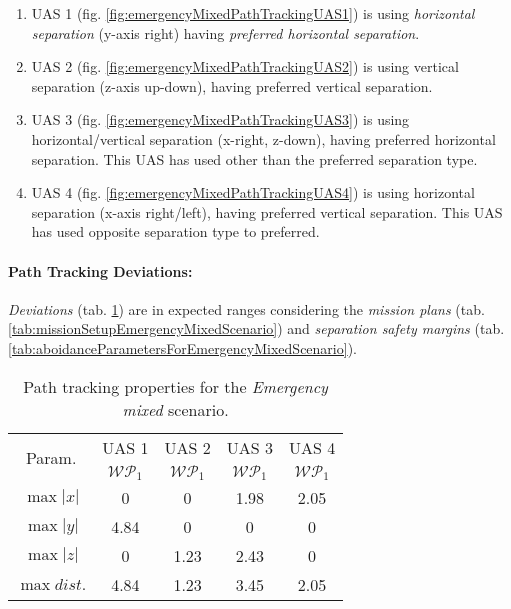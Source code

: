     \begin{enumerate}
        \item UAS 1 (fig. \ref{fig:emergencyMixedPathTrackingUAS1}) is using \emph{horizontal separation} (y-axis right) having \emph{preferred horizontal separation}.
        
        \item UAS 2 (fig. \ref{fig:emergencyMixedPathTrackingUAS2}) is using vertical separation (z-axis up-down), having preferred vertical separation.
        
        \item UAS 3 (fig. \ref{fig:emergencyMixedPathTrackingUAS3}) is using horizontal/vertical separation (x-right, z-down), having preferred horizontal separation.  This UAS has used other than the  preferred separation type.
        
        \item UAS 4 (fig. \ref{fig:emergencyMixedPathTrackingUAS4}) is using horizontal separation (x-axis right/left), having preferred vertical separation. This UAS has used opposite separation type to preferred.
    \end{enumerate}
    
    \noindent\paragraph{Path Tracking Deviations:} \emph{Deviations} (tab. \ref{tab:pathTrackingParametersForEmergencyMixed}) are in expected ranges considering the \emph{mission plans} (tab. \ref{tab:missionSetupEmergencyMixedScenario}) and \emph{separation safety margins} (tab. \ref{tab:aboidanceParametersForEmergencyMixedScenario}).
    
    \begin{table}[H]
        \centering
        \begin{tabular}{c||c|c|c|c}
            \multirow{2}{*}{Param.} & UAS 1     & UAS 2             & UAS 3             & UAS 4 \\\cline{2-5}
                            & $\mathscr{WP}_1$  & $\mathscr{WP}_1$  & $\mathscr{WP}_1$  & $\mathscr{WP}_1$ \\\hline\hline
              $\max |x|$    & 0                 & 0                 & 1.98              & 2.05\\\hline
              $\max |y|$    & 4.84              & 0                 & 0                 & 0\\\hline
              $\max |z|$    & 0                 & 1.23              & 2.43              & 0\\\hline
              $\max dist.$  & 4.84              & 1.23              & 3.45              & 2.05\\
        \end{tabular}
        \caption{Path tracking properties for the \emph{Emergency mixed} scenario.}
        \label{tab:pathTrackingParametersForEmergencyMixed}
    \end{table}    


